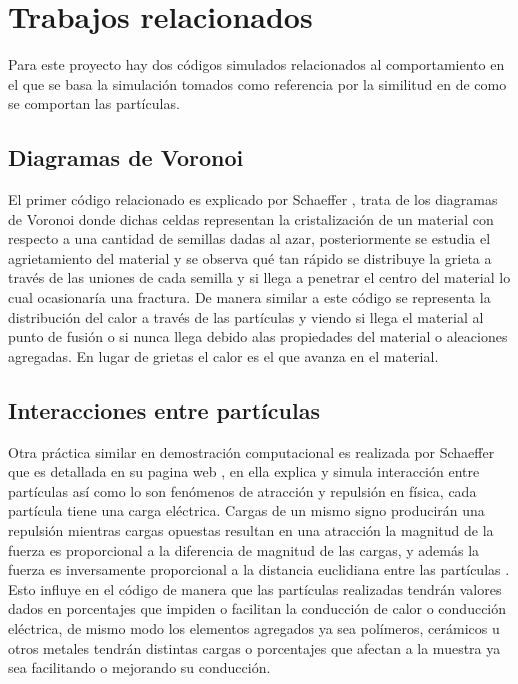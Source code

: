 \documentclass[3pt,twocolumn]{elsarticle}
\begin{document}
\section{Trabajos relacionados}\label{intr}
Para este proyecto hay dos códigos simulados relacionados al comportamiento en el que se basa la simulación tomados como referencia por la similitud en de como se comportan las partículas.

\subsection{Diagramas de Voronoi}
El primer código relacionado es explicado por Schaeffer \cite{DV}, trata de los diagramas de Voronoi donde dichas celdas representan la cristalización de un material con respecto a una cantidad de semillas dadas al azar, posteriormente se estudia el agrietamiento del material y se observa qué tan rápido se distribuye la grieta a través de las uniones de cada semilla y si llega a penetrar el centro del material lo cual ocasionaría una fractura. De manera similar a este código se representa la distribución del calor a través de las partículas y viendo si llega el material al punto de fusión o si nunca llega debido alas propiedades del material o aleaciones agregadas. En lugar de grietas el calor es el que avanza en el material. 

\subsection{Interacciones entre partículas}
Otra práctica similar en demostración computacional es realizada por Schaeffer \cite{IP} que es detallada en su pagina web \cite{dra}, en ella explica y simula interacción entre partículas así como lo son fenómenos de atracción y repulsión en física, cada partícula tiene una carga eléctrica. Cargas de un mismo signo producirán una repulsión mientras cargas opuestas resultan en una atracción la magnitud de la fuerza es proporcional a la diferencia de magnitud de las cargas, y además la fuerza es inversamente proporcional a la distancia euclidiana entre las partículas \cite{IP}. Esto influye en el código de manera que las partículas realizadas tendrán valores dados en porcentajes que impiden o facilitan la conducción de calor o conducción eléctrica, de mismo modo los elementos agregados ya sea polímeros, cerámicos u otros metales tendrán distintas cargas o porcentajes que afectan a la muestra ya sea facilitando o mejorando su conducción.
\end{document}
